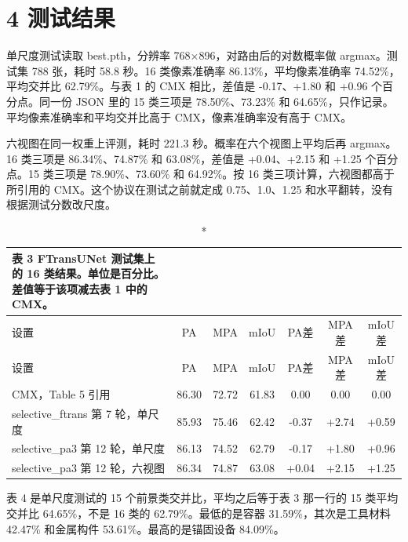 \documentclass[11pt]{article}
\begin{document}
\section*{4  测试结果}
单尺度测试读取 best.pth，分辨率 768×896，对路由后的对数概率做 argmax。测试集 788 张，耗时 58.8 秒。16 类像素准确率 86.13\%，平均像素准确率 74.52\%，平均交并比 62.79\%。与表 1 的 CMX 相比，差值是 -0.17、+1.80 和 +0.96 个百分点。同一份 JSON 里的 15 类三项是 78.50\%、73.23\% 和 64.65\%，只作记录。平均像素准确率和平均交并比高于 CMX，像素准确率没有高于 CMX。

六视图在同一权重上评测，耗时 221.3 秒。概率在六个视图上平均后再 argmax。16 类三项是 86.34\%、74.87\% 和 63.08\%，差值是 +0.04、+2.15 和 +1.25 个百分点。15 类三项是 78.90\%、73.60\% 和 64.92\%。按 16 类三项计算，六视图都高于所引用的 CMX。这个协议在测试之前就定成 0.75、1.0、1.25 和水平翻转，没有根据测试分数改尺度。

{\footnotesize\setlength{\tabcolsep}{3pt}
\begin{longtable}{lcccccc}
\caption*{表 3  FTransUNet 测试集上的 16 类结果。单位是百分比。差值等于该项减去表 1 中的 CMX。}\\
\toprule
设置 & PA & MPA & mIoU & PA差 & MPA差 & mIoU差\\
\midrule
\endfirsthead
\toprule
设置 & PA & MPA & mIoU & PA差 & MPA差 & mIoU差\\
\midrule
\endhead
CMX，Table 5 引用 & 86.30 & 72.72 & 61.83 & 0.00 & 0.00 & 0.00\\
selective\_ftrans 第 7 轮，单尺度 & 85.93 & 75.46 & 62.42 & -0.37 & +2.74 & +0.59\\
selective\_pa3 第 12 轮，单尺度 & 86.13 & 74.52 & 62.79 & -0.17 & +1.80 & +0.96\\
selective\_pa3 第 12 轮，六视图 & 86.34 & 74.87 & 63.08 & +0.04 & +2.15 & +1.25\\
\bottomrule
\end{longtable}
}
表 4 是单尺度测试的 15 个前景类交并比，平均之后等于表 3 那一行的 15 类平均交并比 64.65\%，不是 16 类的 62.79\%。最低的是容器 31.59\%，其次是工具材料 42.47\% 和金属构件 53.61\%。最高的是锚固设备 84.09\%。
\end{document}
